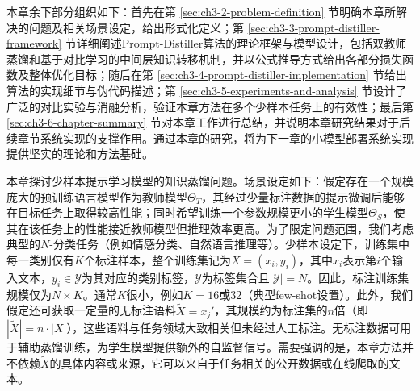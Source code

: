 \documentclass[../main.tex]{subfiles}
\begin{document}
本章余下部分组织如下：首先在第 \ref{sec:ch3-2-problem-definition} 节明确本章所解决的问题及相关场景设定，给出形式化定义；第 \ref{sec:ch3-3-prompt-distiller-framework} 节详细阐述Prompt-Distiller算法的理论框架与模型设计，包括双教师蒸馏和基于对比学习的中间层知识转移机制，并以公式推导方式给出各部分损失函数及整体优化目标；随后在第 \ref{sec:ch3-4-prompt-distiller-implementation} 节给出算法的实现细节与伪代码描述；第 \ref{sec:ch3-5-experiments-and-analysis} 节设计了广泛的对比实验与消融分析，验证本章方法在多个少样本任务上的有效性；最后第 \ref{sec:ch3-6-chapter-summary} 节对本章工作进行总结，并说明本章研究结果对于后续章节系统实现的支撑作用。通过本章的研究，将为下一章的小模型部署系统实现提供坚实的理论和方法基础。

\label{sec:ch3-2-problem-definition}
本章探讨少样本提示学习模型的知识蒸馏问题。场景设定如下：假定存在一个规模庞大的预训练语言模型作为教师模型$\Theta_T$，其经过少量标注数据的提示微调后能够在目标任务上取得较高性能；同时希望训练一个参数规模更小的学生模型$\Theta_S$，使其在该任务上的性能接近教师模型但推理效率更高。为了限定问题范围，我们考虑典型的$N$-分类任务（例如情感分类、自然语言推理等）。少样本设定下，训练集中每一类别仅有$K$个标注样本，整个训练集记为$X={(x_i, y_i)}$，其中$x_i$表示第$i$个输入文本，$y_i \in \mathcal{Y}$为其对应的类别标签，$\mathcal{Y}$为标签集合且$|\mathcal{Y}| = N$。因此，标注训练集规模仅为$N \times K$。通常$K$很小，例如$K=16$或$32$（典型few-shot设置）。此外，我们假定还可获取一定量的无标注语料$\tilde{X}={x_j'}$，其规模约为标注集的$n$倍（即$|\tilde{X}| = n\cdot |X|$），这些语料与任务领域大致相关但未经过人工标注。无标注数据可用于辅助蒸馏训练，为学生模型提供额外的自监督信号。需要强调的是，本章方法并不依赖$\tilde{X}$的具体内容或来源，它可以来自于任务相关的公开数据或在线爬取的文本。
\end{document}
